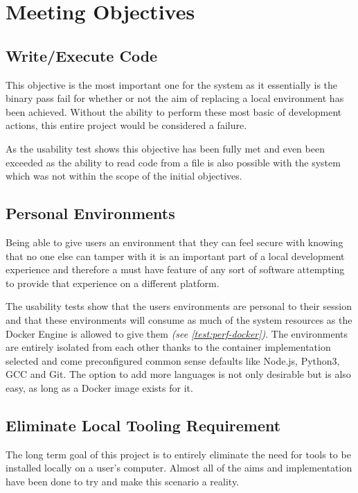 \documentclass[12pt, a4paper]{extreport}
\begin{document}
\section{Meeting Objectives}

\subsection{Write/Execute Code}

This objective is the most important one for the system as it essentially is the binary pass fail for whether or not the aim of replacing a local environment has been achieved. Without the ability to perform these most basic of development actions, this entire project would be considered a failure. 

As the usability test shows this objective has been fully met and even been exceeded as the ability to read code from a file is also possible with the system which was not within the scope of the initial objectives.

\subsection{Personal Environments}

Being able to give users an environment that they can feel secure with knowing that no one else can tamper with it is an important part of a local development experience and therefore a must have feature of any sort of software attempting to provide that experience on a different platform.

The usability tests show that the users environments are personal to their session and that these environments will consume as much of the system resources as the Docker Engine is allowed to give them \textit{(see \ref{test:perf-docker})}. The environments are entirely isolated from each other thanks to the container implementation selected and come preconfigured common sense defaults like Node.js, Python3, GCC and Git. The option to add more languages is not only desirable but is also easy, as long as a Docker image exists for it.

\subsection{Eliminate Local Tooling Requirement}

The long term goal of this project is to entirely eliminate the need for tools to be installed locally on a user's computer. Almost all of the aims and implementation have been done to try and make this scenario a reality.
\end{document}
